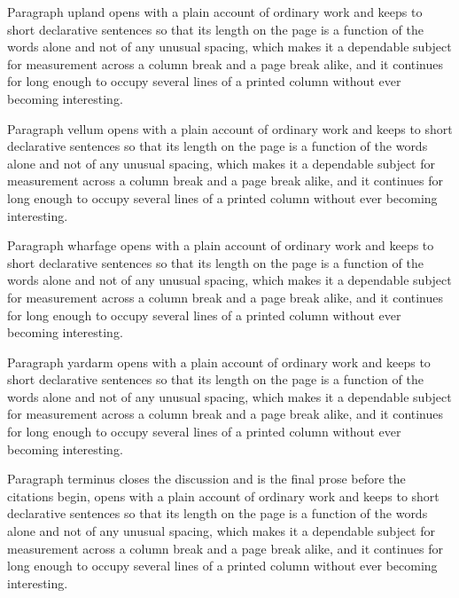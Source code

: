 \documentclass{article}
\begin{document}
Paragraph upland opens with a plain account of ordinary work and keeps to short declarative sentences so that its length on the page is a function of the words alone and not of any unusual spacing, which makes it a dependable subject for measurement across a column break and a page break alike, and it continues for long enough to occupy several lines of a printed column without ever becoming interesting.

Paragraph vellum opens with a plain account of ordinary work and keeps to short declarative sentences so that its length on the page is a function of the words alone and not of any unusual spacing, which makes it a dependable subject for measurement across a column break and a page break alike, and it continues for long enough to occupy several lines of a printed column without ever becoming interesting.

Paragraph wharfage opens with a plain account of ordinary work and keeps to short declarative sentences so that its length on the page is a function of the words alone and not of any unusual spacing, which makes it a dependable subject for measurement across a column break and a page break alike, and it continues for long enough to occupy several lines of a printed column without ever becoming interesting.

Paragraph yardarm opens with a plain account of ordinary work and keeps to short declarative sentences so that its length on the page is a function of the words alone and not of any unusual spacing, which makes it a dependable subject for measurement across a column break and a page break alike, and it continues for long enough to occupy several lines of a printed column without ever becoming interesting.

Paragraph terminus closes the discussion and is the final prose before the citations begin, opens with a plain account of ordinary work and keeps to short declarative sentences so that its length on the page is a function of the words alone and not of any unusual spacing, which makes it a dependable subject for measurement across a column break and a page break alike, and it continues for long enough to occupy several lines of a printed column without ever becoming interesting.
\end{document}
